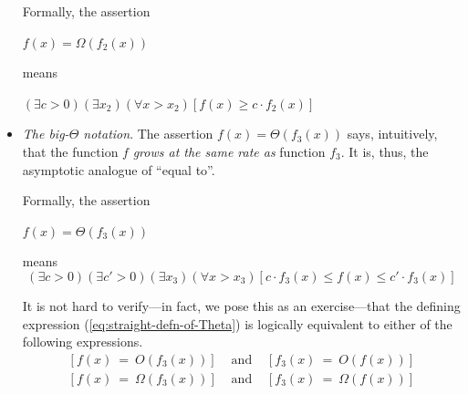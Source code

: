 \begin{itemize}
\smallskip

Formally, the assertion

\smallskip

\hspace*{.2in}
$f(x) = \Omega(f_2(x))$

means

\hspace*{.2in}
$(\exists c >0)(\exists x_2)(\forall x > x_2) [f(x) \geq c \cdot  f_2(x)]$

\medskip\item
{\em The big-$\Theta$ notation}.
The assertion $f(x) = \Theta(f_3(x))$ says, intuitively, that the function $f$ {\em grows at the same rate as} function $f_3$.  It is, thus, the asymptotic analogue of ``equal to''.

\smallskip

Formally, the assertion

\smallskip

\hspace*{.2in}
$f(x) = \Theta(f_3(x))$

means
\begin{equation}
\label{eq:straight-defn-of-Theta}
(\exists c >0)(\exists c' >0)(\exists x_{3})(\forall x > x_{3})
[c \cdot f_3(x) \leq f(x) \leq c' \cdot  f_3(x)]
\end{equation}

\smallskip

It is not hard to verify---in fact, we pose this as an exercise---that the defining expression (\ref{eq:straight-defn-of-Theta}) is logically equivalent to either of the following expressions.
\begin{eqnarray}
\label{eq:Theta-via-O}
\left[ f(x) \ = \ O(f_3(x)) \right] & \mbox{ and } & \left[ f_3(x) \ = \ O(f(x)) \right] \\
\label{eq:Theta-via-Omega}
\left[ f(x) \ = \ \Omega(f_3(x)) \right] & \mbox{ and } & \left[ f_3(x) \ = \ \Omega(f(x)) \right] 
\end{eqnarray}
\end{itemize}

\smallskip

